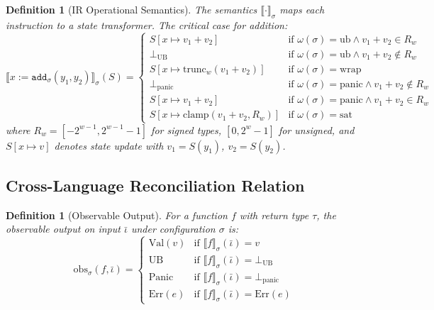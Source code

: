 \documentclass[11pt]{article}
\newtheorem{definition}[theorem]{Definition}
\newcommand{\SemConfig}{\sigma}
\newcommand{\obs}{\mathrm{obs}}
\newcommand{\trunc}{\mathrm{trunc}}
\newcommand{\UB}{\bot_{\mathrm{UB}}}
\newcommand{\Panic}{\bot_{\mathrm{panic}}}
\begin{document}
\begin{definition}[IR Operational Semantics]
\label{def:irsemantics}
The semantics $\llbracket \cdot \rrbracket_\SemConfig$ maps each instruction to a state transformer. The critical case for addition:
\[
\llbracket x := \texttt{add}_\SemConfig(y_1, y_2) \rrbracket_\SemConfig(S) = \begin{cases}
  S[x \mapsto v_1 + v_2] & \text{if } \omega(\SemConfig) = \mathrm{ub} \wedge v_1 + v_2 \in R_w \\
  \UB & \text{if } \omega(\SemConfig) = \mathrm{ub} \wedge v_1 + v_2 \notin R_w \\
  S[x \mapsto \trunc_w(v_1 + v_2)] & \text{if } \omega(\SemConfig) = \mathrm{wrap} \\
  \Panic & \text{if } \omega(\SemConfig) = \mathrm{panic} \wedge v_1 + v_2 \notin R_w \\
  S[x \mapsto v_1 + v_2] & \text{if } \omega(\SemConfig) = \mathrm{panic} \wedge v_1 + v_2 \in R_w \\
  S[x \mapsto \mathrm{clamp}(v_1 + v_2, R_w)] & \text{if } \omega(\SemConfig) = \mathrm{sat}
\end{cases}
\]
where $R_w = [-2^{w-1}, 2^{w-1}-1]$ for signed types, $[0, 2^w - 1]$ for unsigned, and $S[x \mapsto v]$ denotes state update with $v_1 = S(y_1)$, $v_2 = S(y_2)$.
\end{definition}


\subsection{Cross-Language Reconciliation Relation}
\label{sec:reconciliation}

\begin{definition}[Observable Output]
\label{def:observable}
For a function $f$ with return type $\tau$, the observable output on input $\bar{\iota}$ under configuration $\SemConfig$ is:
\[
\obs_\SemConfig(f, \bar{\iota}) = \begin{cases}
  \mathrm{Val}(v) & \text{if } \llbracket f \rrbracket_\SemConfig(\bar{\iota}) = v \\
  \mathrm{UB} & \text{if } \llbracket f \rrbracket_\SemConfig(\bar{\iota}) = \UB \\
  \mathrm{Panic} & \text{if } \llbracket f \rrbracket_\SemConfig(\bar{\iota}) = \Panic \\
  \mathrm{Err}(e) & \text{if } \llbracket f \rrbracket_\SemConfig(\bar{\iota}) = \mathrm{Err}(e)
\end{cases}
\]
\end{definition}
\end{document}
